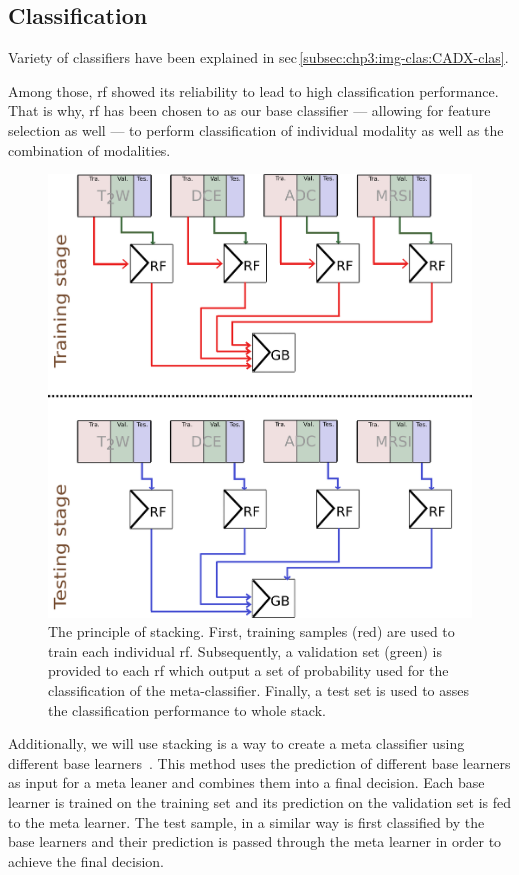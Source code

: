 \subsection{Classification}\label{subsec:chp6:method:clas}
Variety of classifiers have been explained in \acs{sec}\,\ref{subsec:chp3:img-clas:CADX-clas}. 

Among those, \ac{rf} showed its reliability to lead to high classification performance.
That is why, \ac{rf} has been chosen to as our base classifier --- allowing for feature selection as well --- to perform classification of individual modality as well as the combination of modalities.

\begin{figure}
  \centering
  \includegraphics[width=0.5\linewidth]{6_pipeline/figures/stacking_gb.png}
  \caption[The principle of stacking.]{The principle of stacking. First, training samples (red) are used to train each individual \ac{rf}. Subsequently, a validation set (green) is provided to each \ac{rf} which output a set of probability used for the classification of the meta-classifier. Finally, a test set is used to asses the classification performance to whole stack.}
  \label{fig:stacking}
\end{figure}

Additionally, we will use stacking is a way to create a meta classifier using different base learners~\cite{wolpert1992stacked}.
This method uses the prediction of different base learners as input for a meta leaner and combines them into a final decision.
Each base learner is trained on the training set and its prediction on the validation set is fed to the meta learner.
The test sample, in a similar way is first classified by the base learners and their prediction is passed through the meta learner in order to achieve the final decision.
 
